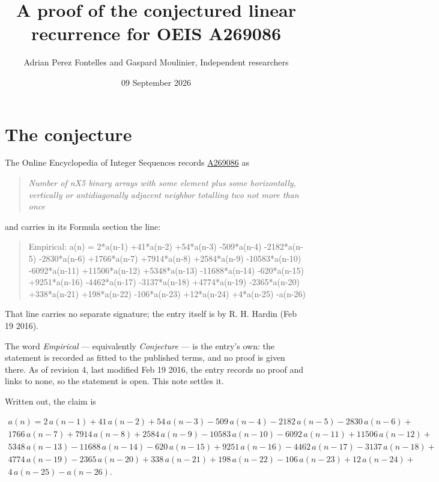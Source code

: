 \documentclass[11pt]{article}
\title{A proof of the conjectured linear recurrence for OEIS A269086}
\author{Adrian Perez Fontelles and Gaspard Moulinier, Independent researchers}
\date{09 September 2026}
\theoremstyle{definition}
\begin{document}
\maketitle
\section{The conjecture}

The Online Encyclopedia of Integer Sequences records \href{https://oeis.org/A269086}{A269086} as

\begin{quote}\itshape Number of nX5 binary arrays with some element plus some horizontally, vertically or antidiagonally adjacent neighbor totalling two not more than once\end{quote}

and carries in its Formula section the line:

\begin{quote}\ttfamily Empirical: a(n) = 2*a(n-1) +41*a(n-2) +54*a(n-3) -509*a(n-4) -2182*a(n-5) -2830*a(n-6) +1766*a(n-7) +7914*a(n-8) +2584*a(n-9) -10583*a(n-10) -6092*a(n-11) +11506*a(n-12) +5348*a(n-13) -11688*a(n-14) -620*a(n-15) +9251*a(n-16) -4462*a(n-17) -3137*a(n-18) +4774*a(n-19) -2365*a(n-20) +338*a(n-21) +198*a(n-22) -106*a(n-23) +12*a(n-24) +4*a(n-25) -a(n-26)\end{quote}

That line carries no separate signature; the entry itself is by R. H. Hardin (Feb 19 2016).

The word {\itshape Empirical} --- equivalently {\itshape Conjecture} --- is the entry's own: the statement is recorded as fitted to the published terms, and no proof is given there. As of revision 4, last modified Feb 19 2016, the entry records no proof and links to none, so the statement is open. This note settles it.

Written out, the claim is

\begin{multline*} a(n) = 2\,a(n-1) + 41\,a(n-2) + 54\,a(n-3) - 509\,a(n-4) - 2182\,a(n-5) - 2830\,a(n-6) + \\ 1766\,a(n-7) + 7914\,a(n-8) + 2584\,a(n-9) - 10583\,a(n-10) - 6092\,a(n-11) + 11506\,a(n-12) + \\ 5348\,a(n-13) - 11688\,a(n-14) - 620\,a(n-15) + 9251\,a(n-16) - 4462\,a(n-17) - 3137\,a(n-18) + \\ 4774\,a(n-19) - 2365\,a(n-20) + 338\,a(n-21) + 198\,a(n-22) - 106\,a(n-23) + 12\,a(n-24) + \\ 4\,a(n-25) - a(n-26). \end{multline*}
\end{document}

